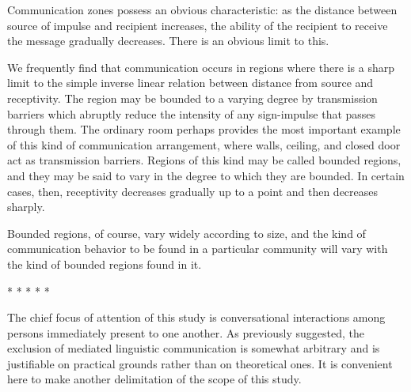 \documentclass[twoside,symmetric,nobib,justified]{tufte-book}
\begin{document}
Communication zones possess an obvious characteristic: as the distance
between source of impulse and recipient increases, the ability of the
recipient to receive the message gradually decreases. There is an
obvious limit to this.

We frequently find that communication occurs in regions where there is a
sharp limit to the simple inverse linear relation between distance from
source and receptivity. The region may be bounded to a varying degree by
transmission barriers which abruptly reduce the intensity of any
sign-impulse that passes through them. The ordinary room perhaps
provides the most important example of this kind of communication
arrangement, where walls, ceiling, and closed door act as transmission
barriers. Regions of this kind may be called bounded regions, and they
may be said to vary in the degree to which they are bounded. In certain
cases, then, receptivity decreases gradually up to a point and then
decreases sharply.

Bounded regions, of course, vary widely according to size, and the kind
of communication behavior to be found in a particular community will
vary with the kind of bounded regions found in it.

\vspace{.2in}
\begin{centering}

\Large{* * * * *}

\end{centering}
\vspace{.17in}

\noindent The chief focus of attention of this study is conversational
interactions among persons immediately present to one another. As
previously suggested, the exclusion of mediated linguistic communication
is somewhat arbitrary and is justifiable on practical grounds rather
than on theoretical ones. It is convenient here to make another
delimitation of the scope of this study.
\end{document}

